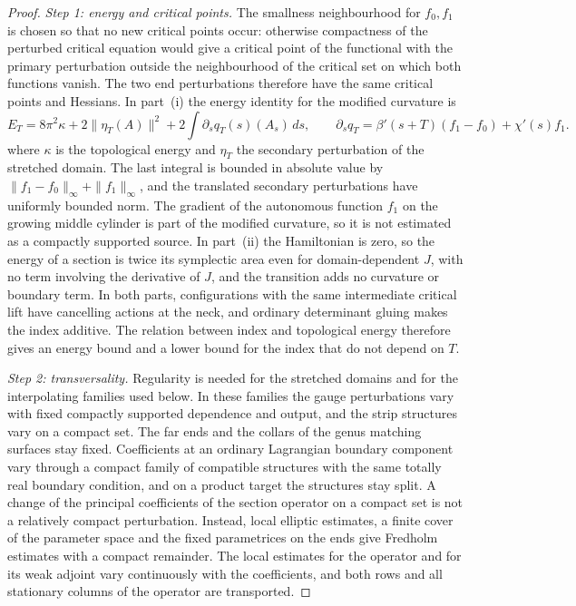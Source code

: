 \documentclass[11pt]{amsart}
\theoremstyle{definition}
\theoremstyle{remark}
\theoremstyle{plain}
\numberwithin{equation}{section}
\begin{document}
\begin{proof}
\emph{Step 1: energy and critical points.} The smallness neighbourhood for
$f_0,f_1$ is chosen so that no new critical points occur: otherwise
compactness of the perturbed critical equation would give a critical
point of the functional with the primary perturbation outside the
neighbourhood of the critical set on which both functions vanish. The two end perturbations therefore have the
same critical points and Hessians. In part~(i) the energy identity for
the modified curvature is
\[
 E_T=8\pi^2\kappa+2\|\eta_T(A)\|^2
                 +2\int\partial_s q_T(s)(A_s)\,ds,
 \qquad
 \partial_s q_T=\beta'(s+T)(f_1-f_0)+\chi'(s)f_1.
\]
where $\kappa$ is the topological energy and $\eta_T$ the secondary perturbation of the stretched domain. The last integral is bounded in absolute value by
$\|f_1-f_0\|_\infty+\|f_1\|_\infty$, and the translated secondary
perturbations have uniformly bounded norm. The gradient of the
autonomous function $f_1$ on the growing middle cylinder is part of
the modified curvature, so it is not estimated as a compactly
supported source. In part~(ii) the Hamiltonian is zero, so the energy
of a section is twice its symplectic area even for domain-dependent
$J$, with no term involving the derivative of $J$, and the transition
adds no curvature or boundary term. In both parts, configurations with
the same intermediate critical lift have cancelling actions at the
neck, and ordinary determinant gluing makes the index additive. The
relation between index and topological energy therefore gives an
energy bound and a lower bound for the index that do not depend on
$T$.

\emph{Step 2: transversality.} Regularity is needed for the stretched
domains and for the interpolating families used below. In these
families the gauge perturbations vary with fixed compactly supported
dependence and output, and the strip structures vary on a compact set.
The far ends and the collars of the genus matching surfaces stay fixed. Coefficients at an ordinary
Lagrangian boundary component vary through a compact family of
compatible structures with the same totally real boundary condition,
and on a product target the structures stay split. A change of the
principal coefficients of the section operator on a compact set is not
a relatively compact perturbation. Instead, local elliptic estimates, a
finite cover of the parameter space and the fixed parametrices on the
ends give Fredholm estimates with a compact remainder. The local
estimates for the operator and for its weak adjoint vary continuously
with the coefficients, and both rows and all stationary columns of the
operator are transported.


\end{proof}
\end{document}
